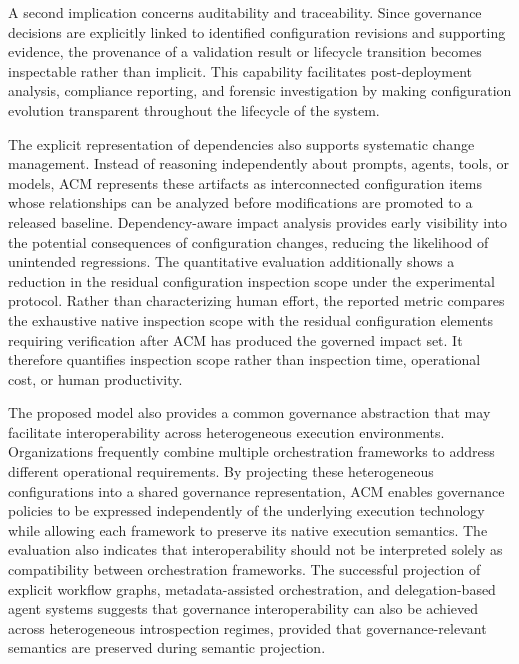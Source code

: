 \documentclass[10pt]{article}
\begin{document}
A second implication concerns auditability and traceability. Since governance decisions are explicitly linked to identified configuration revisions and supporting evidence, the provenance of a validation result or lifecycle transition becomes inspectable rather than implicit. This capability facilitates post-deployment analysis, compliance reporting, and forensic investigation by making configuration evolution transparent throughout the lifecycle of the system.

The explicit representation of dependencies also supports systematic change management. Instead of reasoning independently about prompts, agents, tools, or models, ACM represents these artifacts as interconnected configuration items whose relationships can be analyzed before modifications are promoted to a released baseline. Dependency-aware impact analysis provides early visibility into the potential consequences of configuration changes, reducing the likelihood of unintended regressions. The quantitative evaluation additionally shows a reduction in the residual configuration inspection scope under the experimental protocol. Rather than characterizing human effort, the reported metric compares the exhaustive native inspection scope with the residual configuration elements requiring verification after ACM has produced the governed impact set. It therefore quantifies inspection scope rather than inspection time, operational cost, or human productivity.


The proposed model also provides a common governance abstraction that may facilitate interoperability across heterogeneous execution environments. Organizations frequently combine multiple orchestration frameworks to address different operational requirements. By projecting these heterogeneous configurations into a shared governance representation, ACM enables governance policies to be expressed independently of the underlying execution technology while allowing each framework to preserve its native execution semantics. 
The evaluation also indicates that interoperability should not be interpreted solely as compatibility between orchestration frameworks. The successful projection of explicit workflow graphs, metadata-assisted orchestration, and delegation-based agent systems suggests that governance interoperability can also be achieved across heterogeneous introspection regimes, provided that governance-relevant semantics are preserved during semantic projection.
\end{document}
